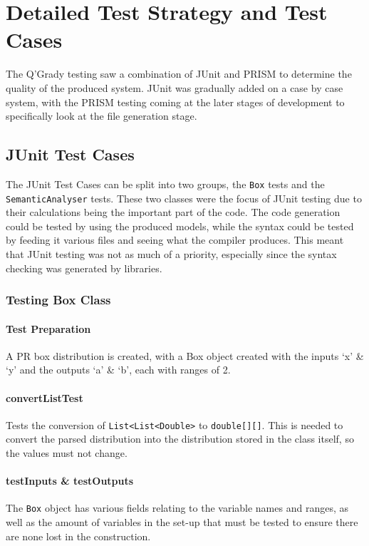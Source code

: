 \documentclass[report.tex]{subfiles}
\begin{document}
\chapter{Detailed Test Strategy and Test Cases} %
\label{cha:detailed_test_strategy_and_test_cases}
The Q'Grady testing saw a combination of JUnit and PRISM to determine the
quality of the produced system. JUnit was gradually added on a case by case
system, with the PRISM testing coming at the later stages of development to
specifically look at the file generation stage.

\section{JUnit Test Cases} %
\label{sec:junit_test_cases}
The JUnit Test Cases can be split into two groups, the \texttt{Box} tests and
the \texttt{SemanticAnalyser} tests. These two classes were the focus of JUnit
testing due to their calculations being the important part of the code. The
code generation could be tested by using the produced models, while the syntax
could be tested by feeding it various files and seeing what the compiler
produces. This meant that JUnit testing was not as much of a priority,
especially since the syntax checking was generated by libraries.
\newpage
\subsection{Testing Box Class} %
\label{sub:testing_box_class}
\subsubsection{Test Preparation} %
\label{ssub:test_preparation}
A PR box distribution is created, with a Box object created with the inputs
`x' \& `y' and the outputs `a' \& `b', each with ranges of 2.

\subsubsection{convertListTest} %
\label{ssub:convertListTest}
Tests the conversion of \texttt{List<List<Double>} to \texttt{double[][]}. This
is needed to convert the parsed distribution into the distribution stored in the
class itself,  so the values must not change.

\subsubsection{testInputs \& testOutputs} %
\label{ssub:test_input_output}
The \texttt{Box} object has various fields relating to the variable names and
ranges, as well as the amount of variables in the set-up that must be tested to
ensure there are none lost in the construction.
\end{document}
